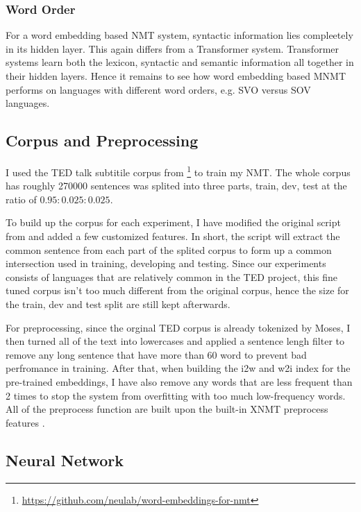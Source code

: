 \documentclass[thesis,fonts=libertine]{cluu}
\begin{document}
\subsubsection{Word Order}

For a word embedding based NMT system, syntactic information lies compleetely in its hidden layer. This again differs from a Transformer system. Transformer systems learn both the lexicon, syntactic and semantic information all together in their hidden layers. Hence it remains to see how word embedding based MNMT performs on languages with different word orders, e.g. SVO versus SOV languages.

\subsection{Corpus and Preprocessing}

I used the TED talk subtitile corpus from \cite{Qi:2018aa} \footnote{\url{https://github.com/neulab/word-embeddings-for-nmt}} to train my NMT. The whole corpus has roughly 270000 sentences was splited into three parts, train, dev, test at the ratio of $0.95:0.025:0.025$.

To build up the corpus for each experiment, I have modified the original script from \cite{Qi:2018aa} and added a few customized features. In short, the script will extract the common sentence from each part of the splited corpus to form up a common intersection used in training, developing and testing. Since our experiments consists of languages that are relatively common in the TED project, this fine tuned corpus isn't too much different from the original corpus, hence the size for the train, dev and test split are still kept afterwards.

For preprocessing, since the orginal TED corpus is already tokenized by Moses, I then turned all of the text into lowercases and applied a sentence lengh filter to remove any long sentence that have more than 60 word to prevent bad perfromance in training. After that, when building the i2w and w2i index for the pre-trained embeddings, I have also remove any words that are less frequent than 2 times to stop the system from overfitting with too much low-frequency words. All of the preprocess function are built upon the built-in XNMT preprocess features \parencite{Neubig:2018aa}.

\subsection{Neural Network}
\end{document}
